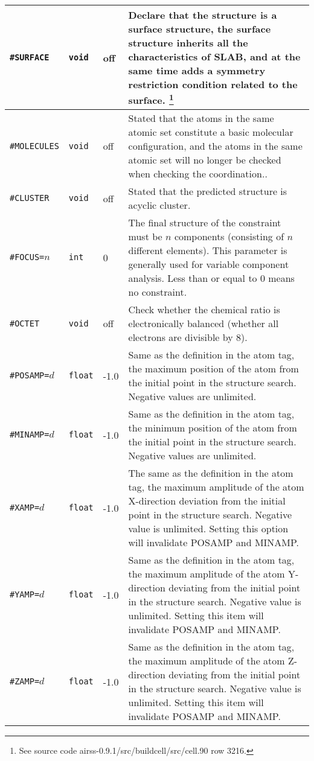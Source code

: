 \documentclass[a4paper, 10pt]{article}
\begin{document}
\begin{center}
\begin{longtable}{m{11em}|m{4em}<{\centering}|m{3em}<{\centering}|m{15em}}
\midrule
\verb|#SURFACE| & \verb|void| & off & Declare that the structure is a surface structure, the surface structure inherits all the characteristics of SLAB, and at the same time adds a symmetry restriction condition related to the surface. \footnote{See source code airss-0.9.1/src/buildcell/src/cell.90 row 3216.}\\
\midrule
\verb|#MOLECULES|& \verb|void| & off & Stated that the atoms in the same atomic set constitute a basic molecular configuration, and the atoms in the same atomic set will no longer be checked when checking the coordination..\\
\midrule
\verb|#CLUSTER| & \verb|void| & off & Stated that the predicted structure is acyclic cluster.\\
\midrule
\verb|#FOCUS=|\(n\) & \verb|int| & 0 & The final structure of the constraint must be \(n\) components (consisting of \(n\) different elements). This parameter is generally used for variable component analysis. Less than or equal to 0 means no constraint.\\
\midrule
\verb|#OCTET|& \verb|void| & off & Check whether the chemical ratio is electronically balanced (whether all electrons are divisible by 8).\\
\midrule
\verb|#POSAMP=|\(d\) & \verb|float|  & -1.0 & Same as the definition in the atom tag, the maximum position of the atom from the initial point in the structure search. Negative values are unlimited.\\
\midrule
\verb|#MINAMP=|\(d\) & \verb|float| & -1.0 & Same as the definition in the atom tag, the minimum position of the atom from the initial point in the structure search. Negative values are unlimited.\\
\midrule
\verb|#XAMP=|\(d\) & \verb|float| & -1.0 & The same as the definition in the atom tag, the maximum amplitude of the atom X-direction deviation from the initial point in the structure search. Negative value is unlimited. Setting this option will invalidate POSAMP and MINAMP. \\
\midrule
\verb|#YAMP=|\(d\) & \verb|float| & -1.0 & Same as the definition in the atom tag, the maximum amplitude of the atom Y-direction deviating from the initial point in the structure search. Negative value is unlimited. Setting this item will invalidate POSAMP and MINAMP.\\
\midrule
\verb|#ZAMP=|\(d\) & \verb|float| & -1.0 & Same as the definition in the atom tag, the maximum amplitude of the atom Z-direction deviating from the initial point in the structure search. Negative value is unlimited. Setting this item will invalidate POSAMP and MINAMP.\\

\end{longtable}
\end{center}
\end{document}
